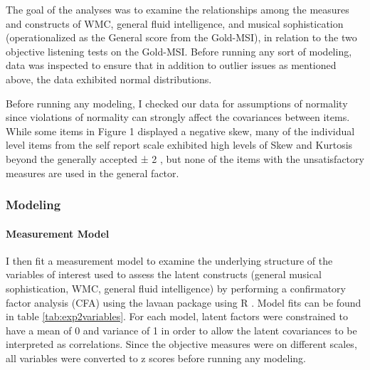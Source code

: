 \documentclass[12pt,]{book}
\let\oldparagraph\paragraph
\renewcommand{\paragraph}[1]{\oldparagraph{#1}\mbox{}}
\begin{document}
The goal of the analyses was to examine the relationships among the measures and constructs of WMC, general fluid intelligence, and musical sophistication (operationalized as the General score from the Gold-MSI), in relation to the two objective listening tests on the Gold-MSI.
Before running any sort of modeling, data was inspected to ensure that in addition to outlier issues as mentioned above, the data exhibited normal distributions.

Before running any modeling, I checked our data for assumptions of normality since violations of normality can strongly affect the covariances between items.
While some items in Figure 1 displayed a negative skew, many of the individual level items from the self report scale exhibited high levels of Skew and Kurtosis beyond the generally accepted ± 2 \citep{fieldDiscoveringStatisticsUsing2012}, but none of the items with the unsatisfactory measures are used in the general factor.

\hypertarget{modeling}{%
\subsubsection{Modeling}\label{modeling}}

\hypertarget{measurement-model}{%
\paragraph{Measurement Model}\label{measurement-model}}

I then fit a measurement model to examine the underlying structure of the variables of interest used to assess the latent constructs (general musical sophistication, WMC, general fluid intelligence) by performing a confirmatory factor analysis (CFA) using the lavaan package \citep{rosseelLavaanPackageStructural2012} using R \citep{teamLanguageEnvironmentStatistical2015}.
Model fits can be found in table \ref{tab:exp2variables}.
For each model, latent factors were constrained to have a mean of 0 and variance of 1 in order to allow the latent covariances to be interpreted as correlations.
Since the objective measures were on different scales, all variables were converted to z scores before running any modeling.
\end{document}
